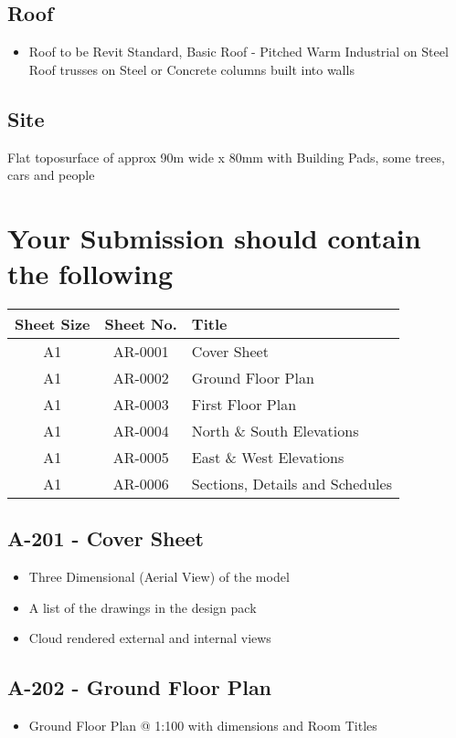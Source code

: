 \subsection*{Roof}
\begin{itemize}
	\item Roof to be Revit Standard, Basic Roof - Pitched Warm Industrial on Steel Roof trusses on Steel or Concrete columns built into walls
\end{itemize}


\subsection*{Site}
Flat toposurface of approx 90m wide x 80mm with Building Pads, some trees, cars and people




\newpage
\section*{Your Submission should contain the following}


\begin{tabularx}{\textwidth}{ |c|c|X| }
	\hline
	\textbf{Sheet Size} & \textbf{Sheet No.} & \textbf{Title} \\
	\hline 
	A1  & AR-0001 & Cover Sheet \\
	A1  & AR-0002 & Ground Floor Plan \\
	A1  & AR-0003 & First Floor Plan \\
	A1  & AR-0004 & North \& South Elevations \\
	A1  & AR-0005 & East \& West Elevations \\
	A1  & AR-0006 & Sections, Details and Schedules \\
	\hline
\end{tabularx}


\subsection*{A-201 - Cover Sheet}
\begin{itemize}
	\item Three Dimensional (Aerial View) of the model
	\item A list of the drawings in the design pack
	\item Cloud rendered external and internal views
\end{itemize}


\subsection*{A-202 - Ground Floor Plan}
\begin{itemize}
	\item Ground Floor Plan @ 1:100 with dimensions and Room Titles
\end{itemize}


